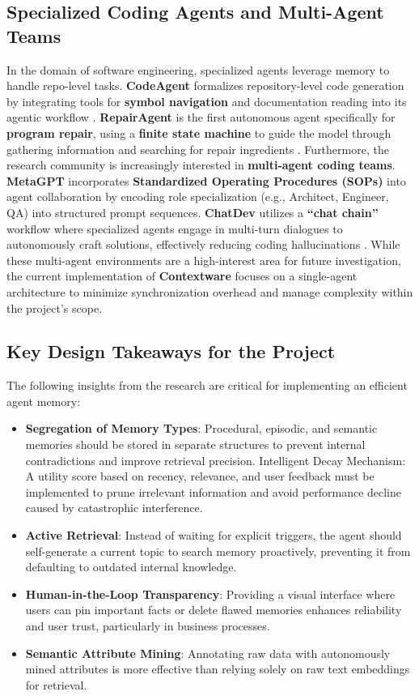 \documentclass[conference]{IEEEtran}
\begin{document}
\subsection{Specialized Coding Agents and Multi-Agent Teams} In the domain of software engineering, specialized agents leverage memory to handle repo-level tasks. \textbf{CodeAgent} formalizes repository-level code generation by integrating tools for \textbf{symbol navigation} and documentation reading into its agentic workflow \cite{Zhang2024CodeAgent}. \textbf{RepairAgent} is the first autonomous agent specifically for \textbf{program repair}, using a \textbf{finite state machine} to guide the model through gathering information and searching for repair ingredients \cite{Bouzenia2025RepairAgent}.
Furthermore, the research community is increasingly interested in \textbf{multi-agent coding teams}. \textbf{MetaGPT} incorporates \textbf{Standardized Operating Procedures (SOPs)} into agent collaboration by encoding role specialization (e.g., Architect, Engineer, QA) into structured prompt sequences. \textbf{ChatDev} utilizes a \textbf{``chat chain''} workflow where specialized agents engage in multi-turn dialogues to autonomously craft solutions, effectively reducing coding hallucinations \cite{Hong2023MetaGPT} \cite{Qian2024ChatDev}. While these multi-agent environments are a high-interest area for future investigation, the current implementation of \textbf{Contextware} focuses on a single-agent architecture to minimize synchronization overhead and manage complexity within the project's scope.

\subsection{Key Design Takeaways for the Project}
The following insights from the research are critical for implementing an efficient agent memory:

\begin{itemize}
    \item \textbf{Segregation of Memory Types}: Procedural, episodic, and semantic memories should be stored in separate structures to prevent internal contradictions and improve retrieval precision.
    Intelligent Decay Mechanism: A utility score based on recency, relevance, and user feedback must be implemented to prune irrelevant information and avoid performance decline caused by catastrophic interference.
    \item \textbf{Active Retrieval}: Instead of waiting for explicit triggers, the agent should self-generate a current topic to search memory proactively, preventing it from defaulting to outdated internal knowledge.
    \item \textbf{Human-in-the-Loop Transparency}: Providing a visual interface where users can pin important facts or delete flawed memories enhances reliability and user trust, particularly in business processes.
    \item \textbf{Semantic Attribute Mining}: Annotating raw data with autonomously mined attributes is more effective than relying solely on raw text embeddings for retrieval.
\end{itemize}
\end{document}

